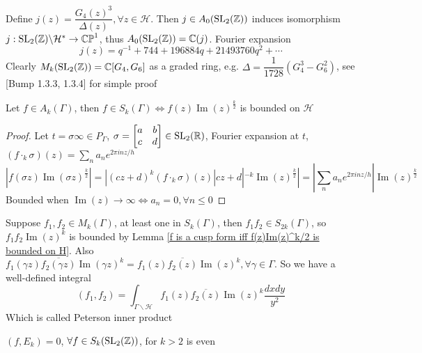 \documentclass[main]{subfiles}
\begin{document}
Define $j(z)=\dfrac{G_4(z)^3}{\Delta(z)},\forall z\in\mathcal H$. Then $j\in A_0(\operatorname{SL}_2(\mathbb Z))$ induces isomorphism $j:\operatorname{SL}_2(\mathbb Z)\backslash\mathcal H^*\to\mathbb{CP}^1$, thus $A_0(\operatorname{SL}_2(\mathbb Z))=\mathbb C(j)$. Fourier expansion
\[j(z)=q^{-1}+744+196884q+21493760q^2+\cdots\]
Clearly $M_k(\operatorname{SL}_2(\mathbb Z))=\mathbb C[G_4,G_6]$ as a graded ring, e.g. $\Delta=\dfrac{1}{1728}(G_4^3-G_6^2)$, see [Bump 1.3.3, 1.3.4] for simple proof

\begin{lemma}\label{f is a cusp form iff f(z)Im(z)^k/2 is bounded on H}
Let $f\in A_k(\Gamma)$, then $f\in S_k(\Gamma)\iff f(z)\operatorname{Im}(z)^{\frac{k}{2}}$ is bounded on $\mathcal H$
\end{lemma}

\begin{proof}
Let $t=\sigma\infty\in P_\Gamma$, $\sigma=\begin{bmatrix}
a&b \\
c&d
\end{bmatrix}\in\operatorname{SL}_2(\mathbb R)$, Fourier expansion at $t$, $(f\cdot_k\sigma)(z)=\sum_{n}a_ne^{2\pi inz/h}$
\[|f(\sigma z)\operatorname{Im}(\sigma z)^{\frac{k}{2}}|=|(cz+d)^k(f\cdot_k\sigma)(z)|cz+d|^{-k}\operatorname{Im}(z)^{\frac{k}{2}}|=|\sum_na_ne^{2\pi inz/h}|\operatorname{Im}(z)^{\frac{k}{2}}\]
Bounded when $\operatorname{Im}(z)\to\infty\iff a_n=0,\forall n\leq0$
\end{proof}

Suppose $f_1,f_2\in M_k(\Gamma)$, at least one in $S_k(\Gamma)$, then $f_1f_2\in S_{2k}(\Gamma)$, so $f_1f_2\operatorname{Im}(z)^k$ is bounded by Lemma \ref{f is a cusp form iff f(z)Im(z)^k/2 is bounded on H}. Also $f_1(\gamma z)\overline{f_2(\gamma z)}\operatorname{Im}(\gamma z)^k=f_1(z)\overline{f_2(z)}\operatorname{Im}(z)^k,\forall\gamma\in\Gamma$. So we have a well-defined integral
\[(f_1,f_2)=\int_{\Gamma\backslash\mathcal H}f_1(z)\overline{f_2(z)}\operatorname{Im}(z)^k\frac{dxdy}{y^2}\]
Which is called Peterson inner product

\begin{exercise}
$(f,E_k)=0$, $\forall f\in S_k(\operatorname{SL}_2(\mathbb Z))$, for $k>2$ is even
\end{exercise}
\end{document}
